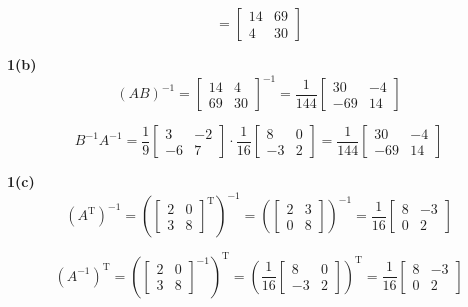 \documentclass{article}
\newcommand{\tp}{^{\mathrm T}}
\begin{document}
\[
= \begin{bmatrix} 14 & 69 \\ 4 & 30 \end{bmatrix}
\]

\textbf{1(b)}
\[
(AB)^{-1} = \begin{bmatrix} 14 & 4 \\ 69 & 30 \end{bmatrix}^{-1}
= \frac{1}{144} \begin{bmatrix} 30 & -4 \\ -69 & 14 \end{bmatrix}
\]

\[
B^{-1}A^{-1} = \frac{1}{9} \begin{bmatrix} 3 & -2 \\ -6 & 7 \end{bmatrix} \cdot \frac{1}{16} \begin{bmatrix} 8 & 0 \\ -3 & 2 \end{bmatrix}
= \frac{1}{144} \begin{bmatrix} 30 & -4 \\ -69 & 14 \end{bmatrix}
\]

\textbf{1(c)}
\[
(A\tp)^{-1} = \left( \begin{bmatrix} 2 & 0 \\ 3 & 8 \end{bmatrix}\tp \right)^{-1}
= \left( \begin{bmatrix} 2 & 3 \\ 0 & 8 \end{bmatrix} \right)^{-1}
= \frac{1}{16} \begin{bmatrix} 8 & -3 \\ 0 & 2 \end{bmatrix}
\]

\[
(A^{-1})\tp = \left( \begin{bmatrix} 2 & 0 \\ 3 & 8 \end{bmatrix}^{-1} \right)\tp
= \left( \frac{1}{16} \begin{bmatrix} 8 & 0 \\ -3 & 2 \end{bmatrix} \right)\tp
= \frac{1}{16} \begin{bmatrix} 8 & -3 \\ 0 & 2 \end{bmatrix}
\]



\vfill
\end{document}
